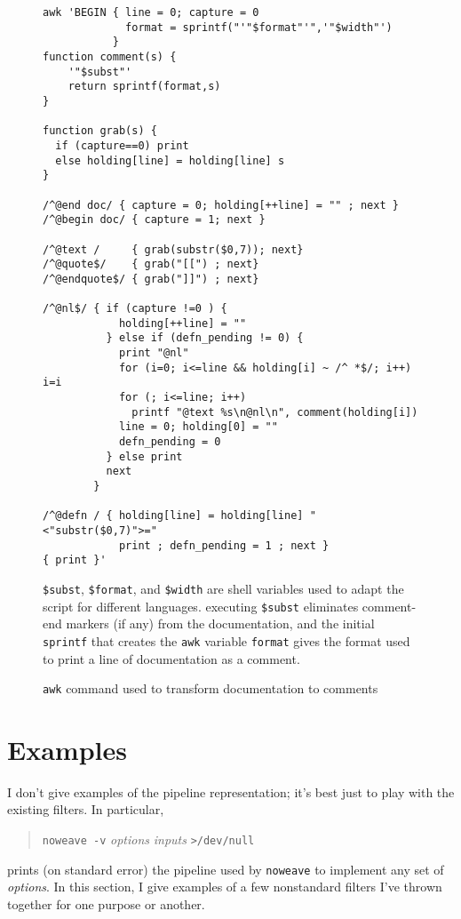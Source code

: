 \documentclass{article}
\newcommand\ltxlabel{\relax}
\let\ltxlabel=\label
\renewcommand\label{{\rm\it label\/}}
\begin{document}
\begin{figure}[p]
\begin{verbatim}
awk 'BEGIN { line = 0; capture = 0
             format = sprintf("'"$format"'",'"$width"')
           }
function comment(s) {
    '"$subst"'
    return sprintf(format,s)
}

function grab(s) {
  if (capture==0) print
  else holding[line] = holding[line] s
}
   
/^@end doc/ { capture = 0; holding[++line] = "" ; next }
/^@begin doc/ { capture = 1; next }

/^@text /     { grab(substr($0,7)); next}
/^@quote$/    { grab("[[") ; next}
/^@endquote$/ { grab("]]") ; next}

/^@nl$/ { if (capture !=0 ) {
            holding[++line] = ""
          } else if (defn_pending != 0) {
            print "@nl"
            for (i=0; i<=line && holding[i] ~ /^ *$/; i++) i=i
            for (; i<=line; i++) 
              printf "@text %s\n@nl\n", comment(holding[i])
            line = 0; holding[0] = ""
            defn_pending = 0
          } else print
          next  
        }

/^@defn / { holding[line] = holding[line] "<"substr($0,7)">="
            print ; defn_pending = 1 ; next }
{ print }'
\end{verbatim}
\caption{{\tt awk} command used to transform documentation to comments}

\smallskip
\noindent
\verb+$subst+, \verb+$format+, and \verb+$width+ are shell variables used
to adapt the script for different languages.
executing \verb+$subst+ eliminates comment-end markers (if any) from
the documentation, and the initial \verb+sprintf+ that creates the
{\tt awk}
variable \verb+format+ gives the format used to print a line of
documentation as a comment.

\ltxlabel{fig:nountangle}
\end{figure}

\afterpage{\clearpage} %


\section{Examples}

I don't give examples of the pipeline
representation; it's best just to
play with the existing filters.
In particular, 
\begin{quote}
{\tt noweave -v} {\it options} {\it inputs} {\tt >/dev/null}
\end{quote}
prints (on standard error) the pipeline used by {\tt noweave}
to implement any set of {\it options}.
In this section, I give examples of a few nonstandard filters I've
thrown together for one purpose or another.
\end{document}
